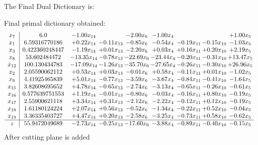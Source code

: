 \documentclass[8pt]{article}
\begin{document}
The Final Dual Dictionary is: 

 Final primal dictionary obtained: 
\[\begin{array}{c| c c@{\hskip 2pt} c@{\hskip 2pt} c@{\hskip 2pt} c@{\hskip 2pt} c@{\hskip 2pt} c@{\hskip 2pt} c@{\hskip 2pt} }
 x_{7}   &  6.0 & -1.00 x_{14} &   & -2.00 x_{6} & -1.00 x_{4} &    &   & +  1.00 x_{5}\\
 x_{1}   &  6.59316770186 & +  0.22 x_{14} & -0.11 x_{13} & -0.85 x_{6} & -0.54 x_{4} & -0.19 x_{11} & -0.15 x_{10} & -1.03 x_{5}\\
 x_{3}   &  0.422360248447 & -1.19 x_{14} & +  0.01 x_{13} & -2.20 x_{6} & +  0.03 x_{4} & +  0.16 x_{11} & +  0.20 x_{10} & +  2.19 x_{5}\\
 x_{8}   &  53.602484472 & -13.35 x_{14} & -0.78 x_{13} & -22.69 x_{6} & -23.44 x_{4} & -0.20 x_{11} & -0.31 x_{10} & + 13.47 x_{5}\\
 x_{12}   &  100.130434783 & -17.09 x_{14} & -1.26 x_{13} & -35.70 x_{6} & -27.65 x_{4} & -0.26 x_{11} & -0.30 x_{10} & + 26.96 x_{5}\\
 x_{2}   &  2.05590062112 & +  0.53 x_{14} & +  0.03 x_{13} & -0.01 x_{6} & +  0.58 x_{4} & -0.11 x_{11} & +  0.01 x_{10} & -1.02 x_{5}\\
 x_{9}   &  4.41925465839 & +  5.01 x_{14} & -0.77 x_{13} & -3.59 x_{6} & -3.67 x_{4} & -0.84 x_{11} & -0.41 x_{10} & -1.64 x_{5}\\
 x_{15}   &  3.82608695652 & +  4.78 x_{14} & -0.65 x_{13} & -2.74 x_{6} & -3.13 x_{4} & -0.65 x_{11} & -0.26 x_{10} & -0.61 x_{5}\\
 x_{16}   &  0.577639751553 & +  1.19 x_{14} & -0.01 x_{13} & -0.80 x_{6} & -0.03 x_{4} & -0.16 x_{11} & +  0.80 x_{10} & -0.19 x_{5}\\
 x_{17}   &  2.55900621118 & +  3.34 x_{14} & +  0.31 x_{13} & -2.12 x_{6} & -2.22 x_{4} & -0.12 x_{11} & +  0.12 x_{10} & -0.19 x_{5}\\
 x_{18}   &  1.61180124224 & +  2.07 x_{14} & +  0.56 x_{13} & -0.52 x_{6} & -1.34 x_{4} & -0.22 x_{11} & +  0.52 x_{10} & -0.04 x_{5}\\
 x_{19}   &  3.36335403727 & +  4.47 x_{14} & +  0.20 x_{13} & -2.58 x_{6} & -3.25 x_{4} & -0.73 x_{11} & +  0.58 x_{10} & -0.62 x_{5}\\
\hline
z    &  55.9472049689 & -2.73 x_{14} & -0.25 x_{13} & -17.60 x_{6} & -3.88 x_{4} & -0.89 x_{11} & -0.40 x_{10} & -0.15 x_{5}\\
\end{array}\]
 After cutting plane is added 
\end{document}
